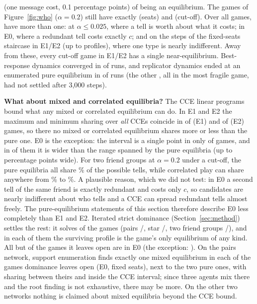 \documentclass[10pt]{article}
\theoremstyle{plain}
\theoremstyle{definition}\newtheorem{definition}{Definition}
\newcommand{\finding}[1]{\textbf{#1}}
\begin{document}
(one message cost, 0.1 percentage points) of being an equilibrium. The games of Figure~\ref{fig:who} ($\alpha=0.2$) still have exactly
\EpsBneHeadSeats{} (seats) and \EpsBneHeadBar{} (cut-off). Over all \EpsBneGames{} games, \EpsBneMulti{} have more than one: \EpsBneLowAlpha{} at
$\alpha\le0.025$, where a tell is worth about what it costs; \EpsBneEzero{} in E0, where a redundant tell costs exactly $c$; and \EpsBneStep{} on the steps of the
fixed-seats staircase in E1/E2 (up to \EpsBneStepMax{} profiles), where one type is nearly indifferent. Away from these, every cut-off game in E1/E2 has a single
near-equilibrium. Best-response dynamics converged in \XoneBrdOk{} of \XoneBrdTot{} runs, and replicator dynamics ended at an enumerated pure equilibrium in \XoneRepMatch{} of \XoneRepTot{} runs (the other \XoneRepRest{}, all in
the most fragile game, had not settled after 3{,}000 steps).

\finding{What about mixed and correlated equilibria?} The CCE linear programs bound what any mixed or correlated equilibrium can do. In E1 and E2 the maximum and minimum sharing over \emph{all} CCEs
coincide in \CceSingleEone{} of \CceTotEone{} (E1) and \CceSingleEtwo{} of \CceTotEtwo{} (E2) games, so there no mixed or correlated equilibrium shares more or less than the pure one. E0 is the exception:
the interval is a single point in only \CceSingleEzero{} of \CceTotEzero{} games, and in \CceWiderEzero{} of them it is wider than the range spanned by the pure equilibria (up to \CceMaxWidthEzero{} percentage points wide).
For two friend groups at $\alpha=0.2$ under a cut-off, the \CceExN{} pure equilibria all share \CceExPure\% of the possible tells, while correlated play can share anywhere from \CceExLo\% to \CceExHi\%.
A plausible reason, which we did not test: in E0 a second tell of the same friend is exactly redundant and costs only $c$, so candidates are nearly indifferent about who tells and a CCE can spread redundant tells almost freely.
The pure-equilibrium statements of this section therefore describe E0 less completely than E1 and E2.
Iterated strict dominance (Section~\ref{sec:method}) settles the rest: it solves \DomSolved{} of the \DomTot{} games (pairs \DomPairsSolved/\DomPairsTot, star \DomStarSolved/\DomStarTot, two friend groups \DomTwoGroupsSolved/\DomTwoGroupsTot),
and in each of them the surviving profile is the game's only equilibrium of any kind. All but \DomOpenOutsideEzero{} of the games it leaves open are in E0 (the exception: \DomOpenWhere). On the pairs network, support enumeration finds exactly one mixed
equilibrium in each of the \SuppPairsMixedGames{} games dominance leaves open (E0, fixed seats), next to the two pure ones, with sharing between theirs and inside the CCE interval; since three agents mix there and the root finding is not
exhaustive, there may be more. On the other two networks nothing is claimed about mixed equilibria beyond the CCE bound.
\end{document}
